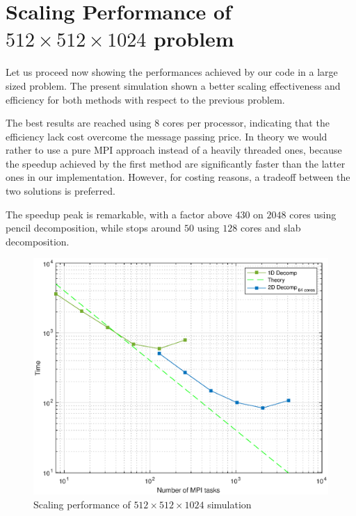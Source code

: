 \section{Scaling Performance of $512\times 512\times 1024$ problem}
Let us proceed now showing the performances achieved by our code in a large sized problem.
The present simulation shown a better scaling effectiveness and efficiency for both methods with respect to the previous problem. 
\par
The best results are reached using 8 cores per processor, indicating that the efficiency lack cost overcome the message passing price.
In theory we would rather to use a pure MPI approach instead of a heavily threaded ones, because the speedup achieved by the first method are significantly faster than the latter ones in our implementation. However, for costing reasons, a tradeoff between the two solutions is preferred. \\
\par
The speedup peak is remarkable, with a factor above $430$ on $2048$ cores using pencil decomposition, while stops around $50$ using $128$ cores and slab decomposition. \\
\par

\begin{figure}
\begin{center}
\includegraphics[scale=0.55]{grafici/5121}
\caption{Scaling performance of $512\times 512\times 1024$ simulation}
\label{5121}
\end{center}
\end{figure}

